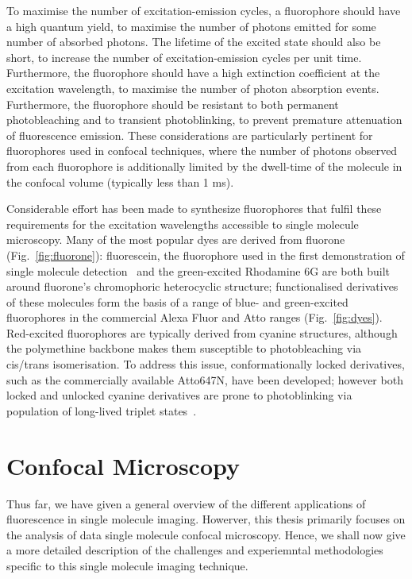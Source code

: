 To maximise the number of excitation-emission cycles, a fluorophore should have a high quantum yield, to maximise the number of photons emitted for some number of absorbed photons. The lifetime of the excited state should also be short, to increase the number of excitation-emission cycles per unit time. Furthermore, the fluorophore should have a high extinction coefficient at the excitation wavelength, to maximise the number of photon absorption events. Furthermore, the fluorophore should be resistant to both permanent photobleaching and to transient photoblinking, to prevent premature attenuation of fluorescence emission. These considerations are particularly pertinent for fluorophores used in confocal techniques, where the number of photons observed from each fluorophore is additionally limited by the dwell-time of the molecule in the confocal volume (typically less than 1 ms).

Considerable effort has been made to synthesize fluorophores that fulfil these requirements for the excitation wavelengths accessible to single molecule microscopy. Many of the most popular dyes are derived from fluorone (Fig.~\ref{fig:fluorone}): fluorescein, the fluorophore used in the first demonstration of single molecule detection~\cite{???} and the green-excited Rhodamine 6G are both built around fluorone's chromophoric heterocyclic structure; functionalised derivatives of these molecules form the basis of a range of blue- and green-excited fluorophores in the commercial Alexa Fluor and Atto ranges (Fig.~\ref{fig:dyes}). Red-excited fluorophores are typically derived from cyanine structures, although the polymethine backbone makes them susceptible to photobleaching via cis/trans isomerisation. To address this issue, conformationally locked derivatives, such as the commercially available Atto647N, have been developed; however both locked and unlocked cyanine derivatives are prone to photoblinking via population of long-lived triplet states~\cite{???}.

\section{Confocal Microscopy}
Thus far, we have given a general overview of the different applications of fluorescence in single molecule imaging. Howerver, this thesis primarily focuses on the analysis of data single molecule confocal microscopy. Hence, we shall now give a more detailed description of the challenges and experiemntal methodologies specific to this single molecule imaging technique.


